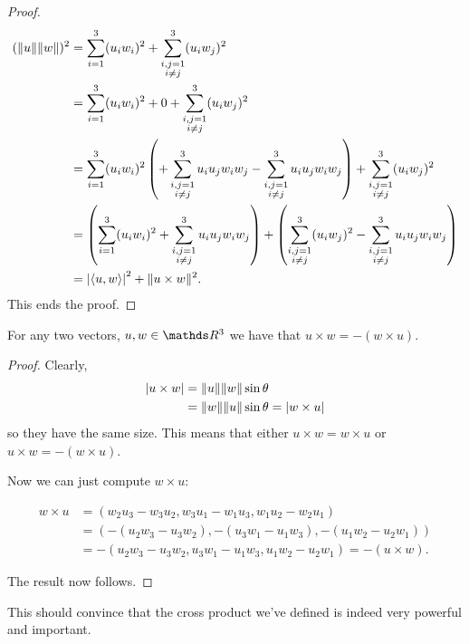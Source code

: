 \begin{proof}
	\begin{align*}
	(\lVert u\rVert\lVert w\rVert)^2&=\sum_{i=1}^3(u_iw_i)^2+\sum_{\substack{i,j=1\\i\neq j
	}}^3(u_iw_j)^2\\
	&=\sum_{i=1}^3(u_iw_i)^2+0+\sum_{\substack{i,j=1\\i\neq j
	}}^3(u_iw_j)^2\\
	&=\sum_{i=1}^3(u_iw_i)^2\left(+\sum_{\substack{i,j=1\\i\neq j}}^3u_iu_jw_iw_j-\sum_{\substack{i,j=1\\i\neq j}}^3u_iu_jw_iw_j\right)+\sum_{\substack{i,j=1\\i\neq j
	}}^3(u_iw_j)^2\\
	&=\left(\sum_{i=1}^3(u_iw_i)^2+\sum_{\substack{i,j=1\\i\neq j}}^3u_iu_jw_iw_j\right)+\left(\sum_{\substack{i,j=1\\i\neq j
	}}^3(u_iw_j)^2-\sum_{\substack{i,j=1\\i\neq j}}^3u_iu_jw_iw_j\right)\\&=\left\vert\langle u,w\rangle\right\vert^2+\lVert u\times w\rVert^2.
	\end{align*}This ends the proof.
\end{proof}
\begin{cor}
	For any two vectors, $u,w\in \R^3$ we have that $u\times w=-(w\times u)$.
\end{cor}
\begin{proof}
	Clearly,
	\begin{align*}
		\left\vert u\times w\right\vert&=\lVert u\rVert\lVert w\rVert\sin \theta\\
		&=\lVert w\rVert\lVert u\rVert\sin\theta=\left\vert w\times u\right\vert
	\end{align*}so they have the same size. This means that either $u\times w=w\times u$ or $u\times w=-(w\times u)$.
	
	Now we can just compute $w\times u$:
	
	\begin{align*}
		w\times u &= (w_2u_3-w_3u_2,w_3u_1-w_1u_3,w_1u_2-w_2u_1)\\
		&=(-(u_2w_3-u_3w_2),-(u_3w_1-u_1w_3),-(u_1w_2-u_2w_1))\\
		&=-(u_2w_3-u_3w_2,u_3w_1-u_1w_3,u_1w_2-u_2w_1)=-(u\times w).
	\end{align*}
	
	The result now follows.
\end{proof}

This should convince that the cross product we've defined is indeed very powerful and important.

